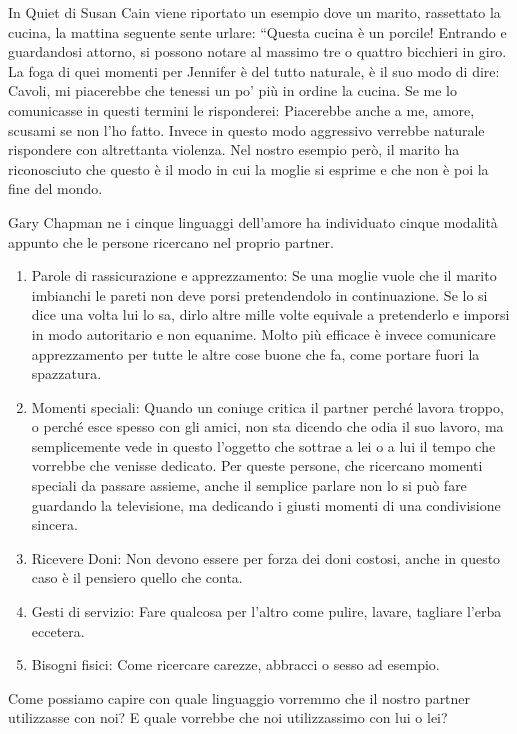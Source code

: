 \documentclass[12pt]{book} %
\begin{document}
In Quiet di Susan Cain viene riportato un esempio dove un marito,
rassettato la cucina, la mattina seguente sente urlare: “Questa cucina è un porcile!{\textquotedbl} Entrando e
guardandosi attorno, si possono notare al massimo tre o quattro bicchieri in giro. La foga di quei momenti per Jennifer
è del tutto naturale, è il suo modo di dire: Cavoli, mi piacerebbe che tenessi un po' più in ordine la cucina. Se me lo
comunicasse in questi termini le risponderei: Piacerebbe anche a me, amore, scusami se non l'ho fatto. Invece in questo
modo aggressivo verrebbe naturale rispondere con altrettanta violenza. Nel nostro esempio però, il marito ha
riconosciuto che questo è il modo in cui la moglie si esprime e che non è poi la fine del mondo.

Gary Chapman ne i cinque linguaggi dell'amore ha individuato cinque
modalità appunto che le persone ricercano nel proprio partner.

\begin{enumerate}
\item Parole di rassicurazione e apprezzamento: Se una moglie vuole che il marito imbianchi le pareti non deve porsi
pretendendolo in continuazione. Se lo si dice una volta lui lo sa, dirlo altre mille volte equivale a pretenderlo e
imporsi in modo autoritario e non equanime. Molto più efficace è invece comunicare apprezzamento per tutte le altre
cose buone che fa, come portare fuori la spazzatura.
\item Momenti speciali: Quando un coniuge critica il partner perché lavora troppo, o perché esce spesso con gli amici,
non sta dicendo che odia il suo lavoro, ma semplicemente vede in questo l'oggetto che sottrae a
lei o a lui il tempo che vorrebbe che venisse dedicato. Per queste persone, che ricercano momenti speciali da passare
assieme, anche il semplice parlare non lo si può fare guardando la televisione, ma dedicando i giusti momenti di una
condivisione sincera.
\item Ricevere Doni: Non devono essere per forza dei doni costosi, anche in questo caso è il pensiero quello che conta.
\item Gesti di servizio: Fare qualcosa per l'altro come pulire, lavare, tagliare l'erba eccetera.
\item Bisogni fisici: Come ricercare carezze, abbracci o sesso ad esempio. 
\end{enumerate}
Come possiamo capire con quale linguaggio vorremmo che il nostro partner utilizzasse con noi? E quale vorrebbe che noi
utilizzassimo con lui o lei?
\end{document}
